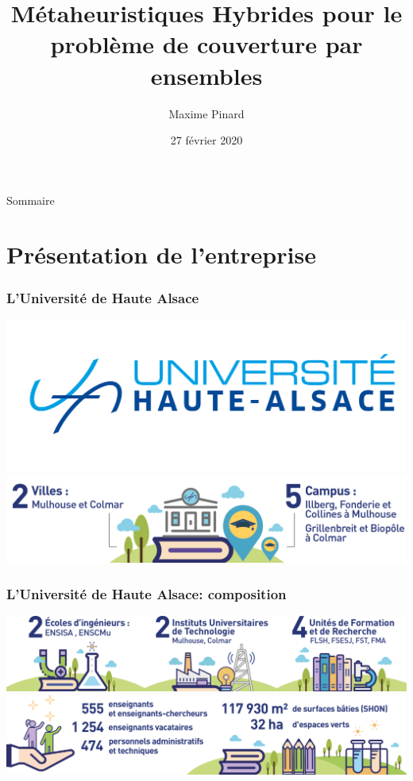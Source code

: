 \documentclass[11pt]{beamer}
\title{Métaheuristiques Hybrides pour le problème de couverture par ensembles}
\author{Maxime Pinard}
\institute[UTBM]{Université de Technologie de Belfort Montbéliard}
\date{27 février 2020}
\begin{document}
	\begin{frame}
		\titlepage
	\end{frame}
	\begin{frame}{Sommaire}
		\tableofcontents
	\end{frame}
	\section{Présentation de l'entreprise}
		\begin{frame}[t]
			\frametitle{L'Université de Haute Alsace}
			\centering
			\includegraphics[width=0.8\linewidth]{UHA_logo}
			\vspace{30pt}
			\includegraphics[width=0.9\linewidth]{UHA_villes_campus}
		\end{frame}
		\begin{frame}[t]
			\frametitle{L'Université de Haute Alsace: composition}
			\centering
			\vspace{25pt}
			\includegraphics[width=\linewidth]{UHA_composition}
			\\\vspace{30pt}
			\includegraphics[width=\linewidth]{UHA_personnel_surface}
		\end{frame}
\end{document}
